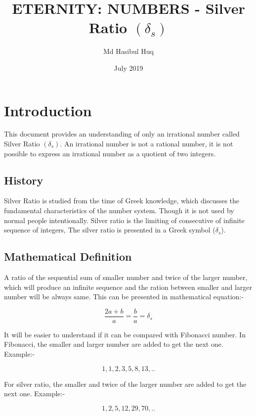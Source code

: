 \documentclass{article}
\title{ETERNITY: NUMBERS - Silver Ratio $(\delta_s)$}
\author{Md Hasibul Huq}
\date{July 2019}
\begin{document}
\maketitle

\section{Introduction}          %

This document provides an understanding of only an irrational  number called Silver Ratio $(\delta_s)$. An irrational  number is  not  a rational  number, it  is  not possible to express an irrational number as a quotient of two integers.
\subsection{History}
Silver Ratio is studied from the time of Greek knowledge, which discusses the fundamental characteristics of the number system. Though it is not used by normal people intentionally. Silver ratio is the limiting of consecutive  of infinite sequence of integers, The silver ratio is presented in a Greek symbol ($\delta_s$).

\subsection{Mathematical Definition}
A ratio of the sequential sum of smaller number and twice of the larger number, which will produce an infinite sequence and the ration between smaller and larger number will be always same. This can be presented in mathematical equation:- 

\[ \dfrac{2a + b}{a}  = \dfrac{b}{a} = \delta_s \] \newline

It will be easier to understand if it can be compared with Fibonacci number.
In Fibonacci, the smaller and larger number are added to get the next one. 
Example:-

\[1,1,2,3,5,8,13,..\] \newline

For silver ratio, the smaller and twice of the larger number are added to get the next one. Example:-

\[1,2,5,12,29,70,..\] 
\end{document}
